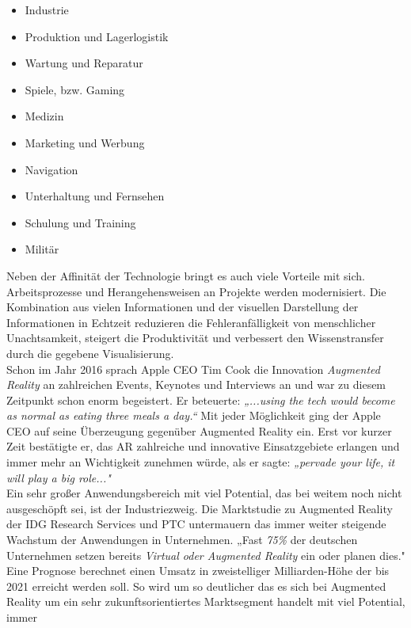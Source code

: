 \begin{itemize}
    \item Industrie 
    \item Produktion und Lagerlogistik
    \item Wartung und Reparatur
    \item Spiele, bzw. Gaming 
    \item Medizin
    \item Marketing und Werbung
    \item Navigation
    \item Unterhaltung und Fernsehen 
    \item Schulung und Training
    \item Militär
\end{itemize} 
Neben der Affinität der Technologie bringt es auch viele Vorteile mit sich. Arbeitsprozesse und Herangehensweisen an Projekte werden 
modernisiert. Die Kombination aus vielen Informationen und der visuellen Darstellung der Informationen in Echtzeit reduzieren die 
Fehleranfälligkeit von menschlicher Unachtsamkeit, steigert die Produktivität und verbessert den Wissenstransfer durch die gegebene 
Visualisierung. 
\\ 
\linebreak
Schon im Jahr 2016 sprach Apple CEO Tim Cook die Innovation \textit{Augmented Reality} an zahlreichen Events, Keynotes und Interviews 
an und war zu diesem Zeitpunkt schon enorm begeistert. Er beteuerte: \textit{„...using the tech would become as normal as eating three 
meals a day.“} \cite{timcook2016.2016o} Mit jeder Möglichkeit ging der Apple CEO auf seine Überzeugung gegenüber Augmented Reality ein. 
Erst vor kurzer Zeit bestätigte er, das AR zahlreiche und innovative Einsatzgebiete erlangen und immer mehr an Wichtigkeit zunehmen 
würde, als er sagte: \textit{„pervade your life, it will play a big role..."} \cite{timcook.2020j} 
\\ 
\linebreak
Ein sehr großer Anwendungsbereich mit viel Potential, das bei weitem noch nicht ausgeschöpft sei, ist der Industriezweig. Die 
Marktstudie zu Augmented Reality der IDG Research Services und PTC untermauern das immer weiter steigende Wachstum der Anwendungen in 
Unternehmen. „Fast \textit{75\%} der deutschen Unternehmen setzen bereits \textit{Virtual oder Augmented Reality} ein oder planen dies." 
\cite{studieptc.2020j} Eine Prognose berechnet einen Umsatz in zweistelliger Milliarden-Höhe der bis 2021 erreicht werden soll. So wird 
um so deutlicher das es sich bei Augmented Reality um ein sehr zukunftsorientiertes Marktsegment handelt mit viel Potential, immer 
